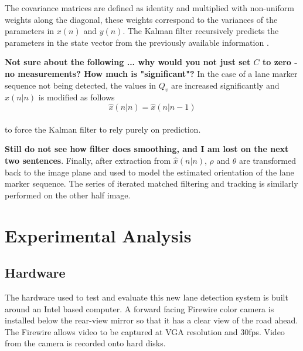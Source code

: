 \documentclass{article}
\begin{document}
The covariance matrices are defined as identity and multiplied with non-uniform weights along the diagonal, these weights correspond to the variances of the parameters in $x(n)$ and $y(n)$. The Kalman filter recursively predicts the parameters in the state vector from the previously available information \cite{hayes_statistical_1996,brookner_tracking_1998}.

{\bf Not sure about the following ... why would you not just set $C$ to zero - no measurements?  How much is "significant"?}
In the case of a lane marker sequence not being detected, the values in $Q_v$ are increased significantly and $\hat{x}(n|n)$ is modified as follows
\begin{equation}
\hat{x}(n|n) = \hat{x}(n|n-1)
\label{eq:xnn_mod}
\end{equation}\\
to force the Kalman filter to rely purely on prediction.

{\bf Still do not see how filter does smoothing, and I am lost on the next two sentences}.
Finally, after extraction from $\hat{x}(n|n)$, $\rho$ and $\theta$ are transformed back to the image plane and used to model the estimated orientation of the lane marker sequence. The series of iterated matched filtering and tracking is similarly performed on the other half image.

\section{Experimental Analysis}
\label{sec:exp_ana}
\subsection{Hardware}
The hardware used to test and evaluate this new lane detection system is built around an Intel based computer.  A forward facing Firewire color camera is installed below the rear-view mirror so that it has a clear view of the road ahead. The Firewire allows video to be captured at VGA resolution and 30fps.
Video from the camera is recorded onto hard disks.
\end{document}
